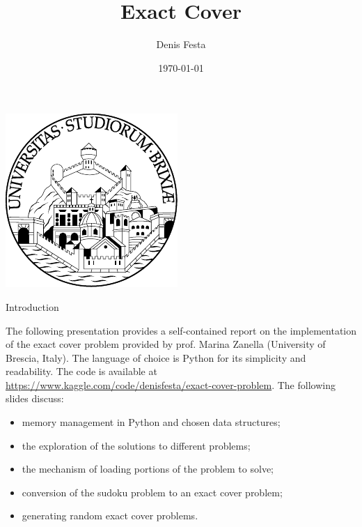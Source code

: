 \documentclass{beamer}
\title{Exact Cover}
\author{Denis Festa}
\date{\today}
\begin{document}
\begin{frame}
    \titlepage
    \centering
    \includegraphics[width=0.2\linewidth]{unibs-circ-logo.pdf}
\end{frame}




\begin{frame}{Introduction}

    The following presentation provides a self-contained report on the 
    implementation of the exact cover problem provided by prof. Marina Zanella
    (University of Brescia, Italy).
    The language of choice is Python for its simplicity and readability.
    The code is available at \url{https://www.kaggle.com/code/denisfesta/exact-cover-problem}.
    The following slides discuss:
    \begin{itemize}
        \item memory management in Python and chosen data structures;
        \item the exploration of the solutions to different problems;
        \item the mechanism of loading portions of the problem to solve;
        \item conversion of the sudoku problem to an exact cover problem;
        \item generating random exact cover problems.
    \end{itemize}

\end{frame}
\end{document}
